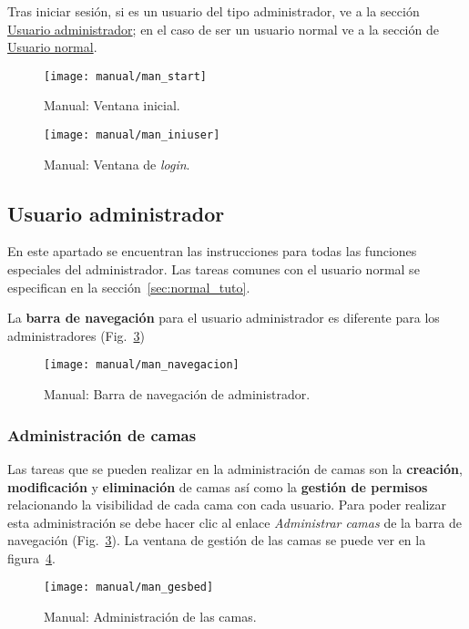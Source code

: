 Tras iniciar sesión, si es un usuario del tipo administrador, ve a la sección \hyperref[sec:admin_tuto]{Usuario administrador}; en el caso de ser un usuario normal ve a la sección de \hyperref[sec:normal_tuto]{Usuario normal}.

\begin{figure}
	\centering
	\texttt{[image: manual/man\_start]}
	\caption{Manual: Ventana inicial.}
	\label{fig:man_start}
\end{figure}
\begin{figure}
	\centering
	\texttt{[image: manual/man\_iniuser]}
	\caption{Manual: Ventana de \textit{login}.}
	\label{fig:man_inicio}
\end{figure}

\subsection{Usuario administrador}\label{sec:admin_tuto}

En este apartado se encuentran las instrucciones para todas las funciones especiales del administrador. Las tareas comunes con el usuario normal se especifican en la sección~\ref{sec:normal_tuto}.

La \textbf{barra de navegación} para el usuario administrador es diferente para los administradores (Fig.~\ref{fig:man_nav})

\begin{figure}
	\centering
	\texttt{[image: manual/man\_navegacion]}
	\caption{Manual: Barra de navegación de administrador.}
	\label{fig:man_nav}
\end{figure}

\subsubsection{Administración de camas}

Las tareas que se pueden realizar en la administración de camas son la \textbf{creación}, \textbf{modificación} y \textbf{eliminación} de camas así como la \textbf{gestión de permisos} relacionando la visibilidad de cada cama con cada usuario.  Para poder realizar esta administración se debe hacer clic al enlace \textit{Administrar camas} de la barra de navegación (Fig.~\ref{fig:man_nav}). La ventana de gestión de las camas se puede ver en la figura~\ref{fig:man_menu_cama}.

\begin{figure}
	\centering
	\texttt{[image: manual/man\_gesbed]}
	\caption{Manual: Administración de las camas.}
	\label{fig:man_menu_cama}
\end{figure}

